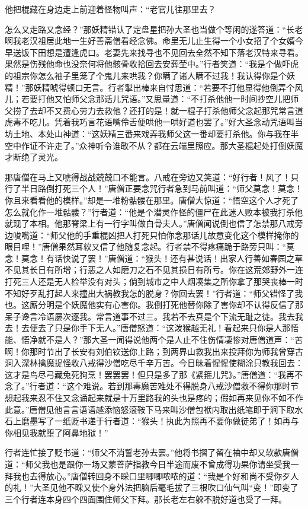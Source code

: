 \documentclass[12pt,UTF8]{ctexbook}
\begin{document}
他把棍藏在身边走上前迎着怪物叫声：“老官儿往那里去？

怎么又走路又念经？”那妖精错认了定盘星把孙大圣也当做个等闲的遂答道：“长老啊我老汉祖居此地一生好善斋僧看经念佛。命里无儿止生得一个小女招了个女婿今早送饭下田想是遭逢虎口。老妻先来找寻也不见回去全然不知下落老汉特来寻看。果然是伤残他命也没奈何将他骸骨收拾回去安葬茔中。”行者笑道：“我是个做吓虎的祖宗你怎么袖子里笼了个鬼儿来哄我？你瞒了诸人瞒不过我！我认得你是个妖精！”那妖精唬得顿口无言。行者掣出棒来自忖思道：“若要不打他显得他倒弄个风儿；若要打他又怕师父念那话儿咒语。”又思量道：“不打杀他他一时间抄空儿把师父捞了去却不又费心劳力去救他？还打的是！就一棍子打杀他师父念起那咒常言道虎毒不吃儿。凭着我巧言花语嘴伶舌便哄他一哄好道也罢了。”好大圣念动咒语叫当坊土地、本处山神道：“这妖精三番来戏弄我师父这一番却要打杀他。你与我在半空中作证不许走了。”众神听令谁敢不从？都在云端里照应。那大圣棍起处打倒妖魔才断绝了灵光。

那唐僧在马上又唬得战战兢兢口不能言。八戒在旁边又笑道：“好行者！风了！只行了半日路倒打死三个人！”唐僧正要念咒行者急到马前叫道：“师父莫念！莫念！你且来看看他的模样。”却是一堆粉骷髅在那里。唐僧大惊道：“悟空这个人才死了怎么就化作一堆骷髅？”行者道：“他是个潜灵作怪的僵尸在此迷人败本被我打杀他就现了本相。他那脊梁上有一行字叫做白骨夫人。”唐僧闻说倒也信了怎禁那八戒旁边唆嘴道：“师父他的手重棍凶把人打死只怕你念那话儿故意变化这个模样掩你的眼目哩！”唐僧果然耳软又信了他随复念起。行者禁不得疼痛跪于路旁只叫：“莫念！莫念！有话快说了罢！”唐僧道：“猴头！还有甚说话！出家人行善如春园之草不见其长日有所增；行恶之人如磨刀之石不见其损日有所亏。你在这荒郊野外一连打死三人还是无人检举没有对头；倘到城市之中人烟凑集之所你拿了那哭丧棒一时不知好歹乱打起人来撞出大祸教我怎的脱身？你回去罢！”行者道：“师父错怪了我也。这厮分明是个妖魔他实有心害你。我倒打死他替你除了害你却不认得反信了那呆子谗言冷语屡次逐我。常言道事不过三。我若不去真是个下流无耻之徒。我去我去！去便去了只是你手下无人。”唐僧怒道：“这泼猴越无礼！看起来只你是人那悟能、悟净就不是人？”那大圣一闻得说他两个是人止不住伤情凄惨对唐僧道声：“苦啊！你那时节出了长安有刘伯钦送你上路；到两界山救我出来投拜你为师我曾穿古洞入深林擒魔捉怪收八戒得沙僧吃尽千辛万苦。今日昧着惺惺使糊涂只教我回去：这才是鸟尽弓藏兔死狗烹！罢罢罢！但只是多了那《紧箍儿咒》。”唐僧道：“我再不念了。”行者道：“这个难说。若到那毒魔苦难处不得脱身八戒沙僧救不得你那时节想起我来忍不住又念诵起来就是十万里路我的头也是疼的；假如再来见你不如不作此意。”唐僧见他言言语语越添恼怒滚鞍下马来叫沙僧包袱内取出纸笔即于涧下取水石上磨墨写了一纸贬书递于行者道：“猴头！执此为照再不要你做徒弟了！如再与你相见我就堕了阿鼻地狱！”

行者连忙接了贬书道：“师父不消誓老孙去罢。”他将书摺了留在袖中却又软款唐僧道：“师父我也是跟你一场又蒙菩萨指教今日半途而废不曾成得功果你请坐受我一拜我也去得放心。”唐僧转回身不睬口里唧唧哝哝的道：“我是个好和尚不受你歹人的礼！”大圣见他不睬又使个身外法把脑后毫毛拔了三根吹口仙气叫“变！”即变了三个行者连本身四个四面围住师父下拜。那长老左右躲不脱好道也受了一拜。
\end{document}
